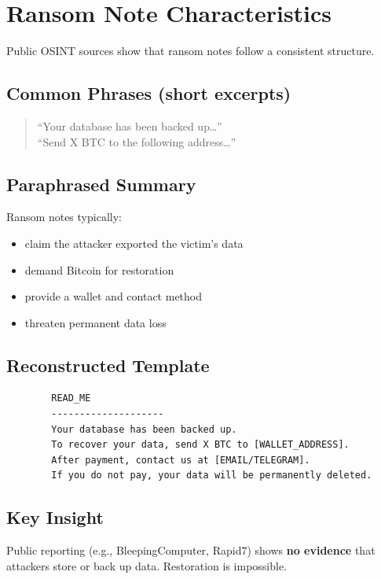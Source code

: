 \documentclass[12pt]{article}
\begin{document}
	\section{Ransom Note Characteristics}
	
	Public OSINT sources show that ransom notes follow a consistent structure.
	
	\subsection*{Common Phrases (short excerpts)}
	\begin{quote}
		“Your database has been backed up…”\\
		“Send X BTC to the following address…”
	\end{quote}
	
	\subsection*{Paraphrased Summary}
	Ransom notes typically:
	
	\begin{itemize}
		\item claim the attacker exported the victim’s data  
		\item demand Bitcoin for restoration  
		\item provide a wallet and contact method  
		\item threaten permanent data loss  
	\end{itemize}
	
	\subsection*{Reconstructed Template}
	
	\begin{verbatim}
		READ_ME
		--------------------
		Your database has been backed up.
		To recover your data, send X BTC to [WALLET_ADDRESS].
		After payment, contact us at [EMAIL/TELEGRAM].
		If you do not pay, your data will be permanently deleted.
	\end{verbatim}
	
	\subsection*{Key Insight}
	Public reporting (e.g., BleepingComputer, Rapid7) shows \textbf{no evidence} that attackers store or back up data.  
	Restoration is impossible.
	
\end{document}
